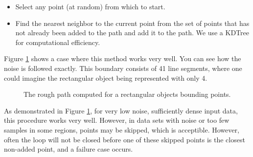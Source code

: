 \documentclass{InsightArticle}
\begin{document}
\begin{itemize}
 \item Select any point (at random) from which to start.
 \item Find the nearest neighbor to the current point from the set of points that has not already been added to the path and add it to the path. We use a KDTree for computational efficiency.
\end{itemize}

Figure \ref{fig:RoughBoundary} shows a case where this method works very well. You can see how the noise is followed exactly. This boundary consists of 41 line segments, where one could imagine the rectangular object being represented with only 4.
\begin{figure}[H]
\centering
{}
\caption{The rough path computed for a rectangular objects bounding points.}
\label{fig:RoughBoundary}
\end{figure}

As demonstrated in Figure \ref{fig:RoughBoundary}, for very low noise, sufficiently dense input data, this procedure works very well. However, in data sets with noise or too few samples in some regions, points may be skipped, which is acceptible. However, often the loop will not be closed before one of these skipped points is the closest non-added point, and a failure case occurs.
\end{document}
